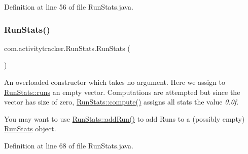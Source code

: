 Definition at line 56 of file Run\+Stats.\+java.


\begin{DoxyCode}{0}

\end{DoxyCode}
\mbox{\label{classcom_1_1activitytracker_1_1_run_stats_a851891349994df7dcfd7bb599c413e35}} 
\subsubsection{\texorpdfstring{RunStats()}{RunStats()}\hspace{0.1cm}{\footnotesize\ttfamily [2/2]}}
{\footnotesize\ttfamily com.\+activitytracker.\+Run\+Stats.\+Run\+Stats (\begin{DoxyParamCaption}{ }\end{DoxyParamCaption})\hspace{0.3cm}{\ttfamily [package]}}

An overloaded constructor which takes no argument. Here we assign to \mbox{\hyperlink{classcom_1_1activitytracker_1_1_run_stats_a0fd429e9f463ddf4897c507c0e3c0a12}{Run\+Stats\+::runs}} an empty vector. Computations are attempted but since the vector has size of zero, \mbox{\hyperlink{classcom_1_1activitytracker_1_1_run_stats_ac73cb94cc8ff604fe446d9a327e420cc}{Run\+Stats\+::compute()}} assigns all stats the value {\itshape 0.\+0f}.

You may want to use \mbox{\hyperlink{classcom_1_1activitytracker_1_1_run_stats_a1b00f177e7c4abc155bb03c6a8b5d7dd}{Run\+Stats\+::add\+Run()}} to add Runs to a (possibly empty) \mbox{\hyperlink{classcom_1_1activitytracker_1_1_run_stats}{Run\+Stats}} object. 

Definition at line 68 of file Run\+Stats.\+java.


\begin{DoxyCode}{0}

\end{DoxyCode}


